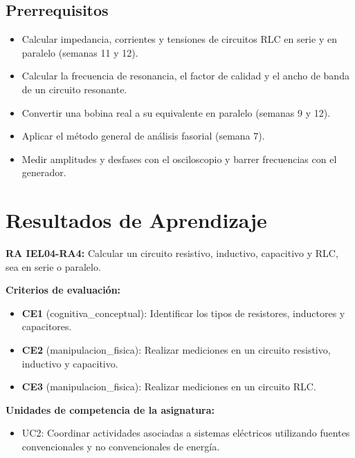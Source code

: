 \documentclass[11pt,letterpaper]{article}
\begin{document}
\subsection{Prerrequisitos}

\begin{itemize}
  \item Calcular impedancia, corrientes y tensiones de circuitos RLC en serie y en paralelo (semanas 11 y 12).
  \item Calcular la frecuencia de resonancia, el factor de calidad y el ancho de banda de un circuito resonante.
  \item Convertir una bobina real a su equivalente en paralelo (semanas 9 y 12).
  \item Aplicar el método general de análisis fasorial (semana 7).
  \item Medir amplitudes y desfases con el osciloscopio y barrer frecuencias con el generador.
\end{itemize}

\section{Resultados de Aprendizaje}

\begin{alineacion}
\textbf{RA IEL04-RA4:} Calcular un circuito resistivo, inductivo, capacitivo y RLC, sea en serie o paralelo.

\textbf{Criterios de evaluación:}

\begin{itemize}
  \item \textbf{CE1} (cognitiva\_conceptual): Identificar los tipos de resistores, inductores y capacitores.
  \item \textbf{CE2} (manipulacion\_fisica): Realizar mediciones en un circuito resistivo, inductivo y capacitivo.
  \item \textbf{CE3} (manipulacion\_fisica): Realizar mediciones en un circuito RLC.
\end{itemize}

\textbf{Unidades de competencia de la asignatura:}

\begin{itemize}
  \item UC2: Coordinar actividades asociadas a sistemas eléctricos utilizando fuentes convencionales y no convencionales de energía.
\end{itemize}
\end{alineacion}
\end{document}
